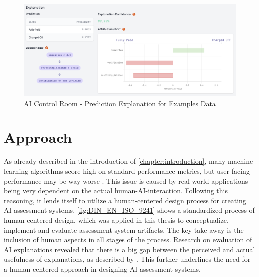 \documentclass[11pt,a4paper,english]{scrreprt}
\begin{document}
\begin{figure}[htbp]
    \centering
    \includegraphics[width=\textwidth]{img/screenshots/model_assessment_explanation.png}
    \caption{AI Control Room - Prediction Explanation for Examples Data}
    \label{fig:model_assessment_explanation}
\end{figure}
\clearpage

\section{Approach}
As already described in the introduction of \autoref{chapter:introduction}, many machine learning algorithms score high on standard performance metrics, but user-facing performance may be way worse \parencite{gordon_disagreement_2021}. This issue is caused by real world applications being very dependent on the actual human-AI-interaction. Following this reasoning, it lends itself to utilize a human-centered design process for creating AI-assessment systems. \autoref{fig:DIN_EN_ISO_9241} shows a standardized process of human-centered design, which was applied in this thesis to conceptualize, implement and evaluate assessment system artifacts. The key take-away is the inclusion of human aspects in all stages of the process. Research on evaluation of AI explanations revealed that there is a big gap between the perceived and actual usefulness of explanations, as described by \textcite{ras_explainable_2021}. This further underlines the need for a human-centered approach in designing AI-assessment-systems.
\end{document}
